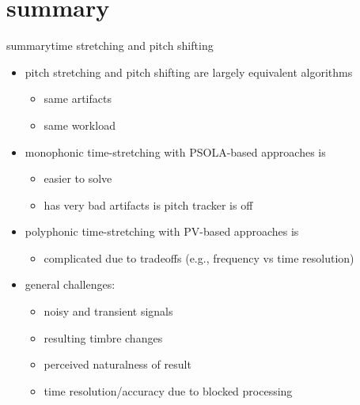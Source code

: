 \section{summary}
		\begin{frame}{summary}{time stretching and pitch shifting}
            \begin{itemize}
                \item   pitch stretching and pitch shifting are largely equivalent algorithms
                    \begin{itemize}
                        \item   same artifacts
                        \item   same workload
                    \end{itemize}
                \bigskip
                \item   monophonic time-stretching with PSOLA-based approaches is
                    \begin{itemize}
                        \item   easier to solve
                        \item   has very bad artifacts is pitch tracker is off
                    \end{itemize}
                \bigskip
                \item   polyphonic time-stretching with PV-based approaches is
                    \begin{itemize}
                        \item   complicated due to tradeoffs (e.g., frequency vs time resolution)
                    \end{itemize}
                \bigskip
                \item   general challenges: 
                    \begin{itemize}
                        \item   noisy and transient signals
                        \item   resulting timbre changes
                        \item   perceived naturalness of result
                        \item   time resolution/accuracy due to blocked processing
                    \end{itemize}
            \end{itemize}
 		\end{frame}



